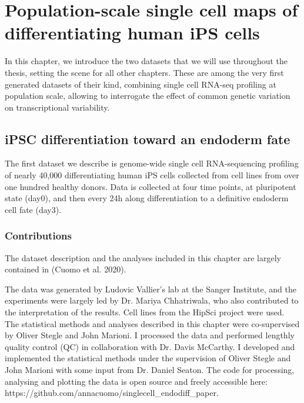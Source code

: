 
\chapter{Population-scale single cell maps of differentiating human iPS cells}

In this chapter, we introduce the two datasets that we will use throughout the thesis, setting the scene for all other chapters. These are among the very first generated datasets of their kind, combining single cell RNA-seq profiling at population scale, allowing to interrogate the effect of common genetic variation on transcriptional variability.

\section{iPSC differentiation toward an endoderm fate}

The first dataset we describe is genome-wide single cell RNA-sequencing profiling of nearly 40,000 differentiating human iPS cells collected from cell lines from over one hundred healthy donors. Data is collected at four time points, at pluripotent state (day0), and then every 24h along differentiation to a definitive endoderm cell fate (day3).

\vspace{5mm}

\subsection{Contributions}

\noindent The dataset description and the analyses included in this chapter are largely contained in (Cuomo et al. 2020).

\vspace{5mm}

\noindent The data was generated by Ludovic Vallier’s lab at the Sanger Institute, and the experiments were largely led by Dr. Mariya Chhatriwala, who also contributed to the interpretation of the results. Cell lines from the HipSci project were used.
The statistical methods and analyses described in this chapter were co-supervised by Oliver Stegle and John Marioni. I processed the data and performed lengthly quality control (QC) in collaboration with Dr. Davis McCarthy. I developed and implemented the statistical methods under the supervision of Oliver Stegle and John Marioni with some input from Dr. Daniel  Seaton. The code for processing, analysing and plotting the data is open source and freely accessible here: https://github.com/annacuomo/singlecell\_endodiff\_paper. 

